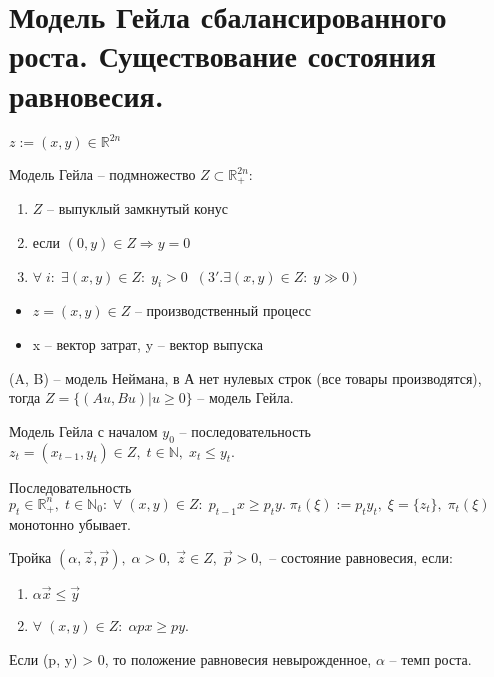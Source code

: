 \chapter{Модель Гейла сбалансированного роста. Существование состояния равновесия.}\label{cha:13}

$z:= (x,y) \in \mathbb{R}^{2n}$

\begin{definition}
	Модель Гейла -- подмножество $Z \subset \mathbb{R}^{2n}_+:$
	\begin{enumerate}
		\item $Z$ -- выпуклый замкнутый конус
		\item если $(0,y) \in Z \Rightarrow y = 0$
		\item $\forall \; i: \; \exists (x,y) \in Z: \; y_i > 0 \;\; (3'. \exists (x,y)\in Z: \; y \gg 0)$
	\end{enumerate}
\end{definition}

\begin{itemize}
	\item $z = (x,y) \in Z$ -- производственный процесс
	\item x -- вектор затрат, y -- вектор выпуска
\end{itemize}

\begin{clair}
	(A, B) -- модель Неймана, в А нет нулевых строк (все товары производятся), тогда $Z = \{ (Au, Bu) | u \geq 0\}$ -- модель Гейла.
\end{clair}

\begin{definition}
	Модель Гейла с началом $y_0$ -- последовательность $z_t = (x_{t-1}, y_t) \in Z, \; t \in \mathbb{N}, \; x_t \leq y_t.$
\end{definition}

\begin{definition}
	Последовательность $p_t \in \mathbb{R}_+^n, \; t \in \mathbb{N}_0: \; \forall \; (x,y) \in Z: \; p_{t-1}x \geq p_t y. \; \pi_t(\xi) := p_t y_t, \; \xi = \{ z_t\}, \; \pi_t(\xi)$ монотонно убывает.
\end{definition}

\begin{definition}
	Тройка $(\alpha, \vec{z}, \vec{p}), \; \alpha > 0, \; \vec{z} \in Z, \; \vec{p} > 0,$ -- состояние равновесия, если:
	\begin{enumerate}
		\item $\alpha \vec{x} \leq \vec{y}$
		\item $\forall \; (x, y) \in Z: \; \alpha p x \geq py$.
	\end{enumerate}

	Если (p, y) > 0, то положение равновесия невырожденное, $\alpha$ -- темп роста.
\end{definition}

